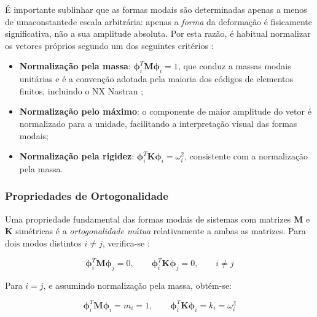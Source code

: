 \documentclass[a4paper,fleqn,noprintline]{cas-dc}
\begin{document}
É importante sublinhar que as formas modais são determinadas apenas a menos de umaconstantede escala arbitrária: apenas a \textit{forma} da deformação é fisicamente significativa, não a sua amplitude absoluta. Por esta razão, é habitual normalizar os vetores próprios segundo um dos seguintes critérios \cite{Craig2006}:

\begin{itemize}
    \item \textbf{Normalização pela massa}: $\boldsymbol{\phi}_i^T \mathbf{M} \boldsymbol{\phi}_i = 1$, que conduz a massas modais unitárias e é a convenção adotada pela maioria dos códigos de elementos finitos, incluindo o NX Nastran \cite{Nastran2014};
    
    \item \textbf{Normalização pelo máximo}: o componente de maior amplitude do vetor é normalizado para a unidade, facilitando a interpretação visual das formas modais;
    
    \item \textbf{Normalização pela rigidez}: $\boldsymbol{\phi}_i^T \mathbf{K} \boldsymbol{\phi}_i = \omega_i^2$, consistente com a normalização pela massa.
\end{itemize}

\subsubsection{Propriedades de Ortogonalidade}

Uma propriedade fundamental das formas modais de sistemas com matrizes $\mathbf{M}$ e $\mathbf{K}$ simétricas é a \textit{ortogonalidade mútua} relativamente a ambas as matrizes. Para dois modos distintos $i \neq j$, verifica-se \cite{Clough1993, Inman2014}:

\begin{equation}
    \boldsymbol{\phi}_i^T \mathbf{M} \boldsymbol{\phi}_j = 0, \qquad 
    \boldsymbol{\phi}_i^T \mathbf{K} \boldsymbol{\phi}_j = 0, \qquad 
    i \neq j
    \label{eq:ortogonalidade}
\end{equation}

Para $i = j$, e assumindo normalização pela massa, obtém-se:

\begin{equation}
    \boldsymbol{\phi}_i^T \mathbf{M} \boldsymbol{\phi}_i = m_i = 1, 
    \qquad
    \boldsymbol{\phi}_i^T \mathbf{K} \boldsymbol{\phi}_i = k_i = 
    \omega_i^2
    \label{eq:massas_rigidezes_modais}
\end{equation}
\end{document}
